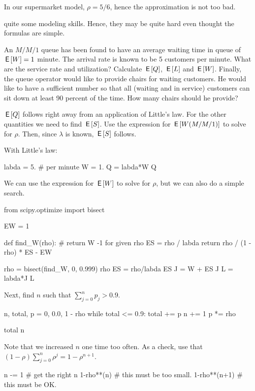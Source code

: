 In our supermarket model, $\rho=5/6$, hence the approximation is not too bad.


 quite some modeling skills. Hence, they may be quite hard even thought the formulas are simple.

\begin{exercise}[Hall 5.6]
An $M/M/1$ queue has been found to have an average waiting time in queue of $\,\mathsf{E}\left[W\right] = 1$ minute.
The arrival rate is known to be 5 customers per minute.
What are the service rate and utilization?
Calculate $\,\mathsf{E}\left[Q\right]$, $\,\mathsf{E}\left[L\right]$ and $\,\mathsf{E}\left[W\right]$.
Finally, the queue operator would like to provide chairs for waiting customers.
He would like to have a sufficient number so that all (waiting and in service) customers can sit down at least 90 percent of the time.
How many chairs should he provide?
\begin{hint}
  $\,\mathsf{E}\left[Q\right]$ follows right away from an application of Little's law.
  For the other quantities we need to find $\,\mathsf{E}\left[S\right]$.
  Use the expression for  $\,\mathsf{E}\left[W(M/M/1)\right]$ to solve for $\rho$. Then, since $\lambda$ is known, $\,\mathsf{E}\left[S\right]$ follows.
\end{hint}
\begin{solution} With Little's law:
\begin{pyconsole}
labda = 5. # per minute
W = 1.
Q = labda*W
Q
\end{pyconsole}

We can use the expression for $\,\mathsf{E}\left[W\right]$ to solve for $\rho$, but we can also do a simple search.
\begin{pyconsole}
from scipy.optimize import bisect

EW = 1

def find_W(rho): # return W -1 for given rho
    ES = rho / labda
    return rho / (1 - rho) * ES - EW


rho = bisect(find_W, 0, 0.999)
rho
ES = rho/labda
ES
J = W + ES
J
L = labda*J
L
\end{pyconsole}
Next, find $n$ such that $\sum_{j=0}^n p_j > 0.9$.
\begin{pyconsole}
n, total, p = 0, 0.0, 1 - rho
while total <= 0.9:
    total += p
    n += 1
    p *= rho

total
n
\end{pyconsole}
Note that we increased $n$ one time too often. As a check,  use that $(1-\rho) \sum_{j=0}^n \rho^j = 1-\rho^{n+1}$.
\begin{pyconsole}
n -= 1 # get the right n
1-rho**(n) # this must be too small.
1-rho**(n+1) # this must be OK.
\end{pyconsole}
\end{solution}
\end{exercise}



